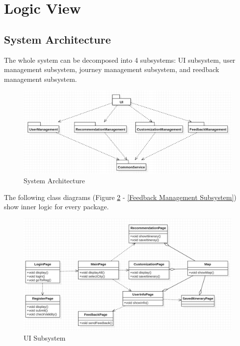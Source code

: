 \documentclass[10pt]{article}
\begin{document}
\section{Logic View}
\subsection{System Architecture}
The whole system can be decomposed into 4 subsystems: UI subsystem, user management subsystem, journey management subsystem, and reedback management subsystem.

\begin{figure}[H]
    \centering
    \includegraphics[width=14cm]{architecture.png}
    \caption{System Architecture}
    \label{System Architecture}
\end{figure}

The following class diagrams (Figure \ref{UI Subsystem} - \ref{Feedback Management Subsystem}) show inner logic for every package.

\begin{figure}[H]
    \centering
    
    \includegraphics[width=14cm]{uiclass.png}
    \caption{UI Subsystem}
    \label{UI Subsystem}
\end{figure}
\end{document}
